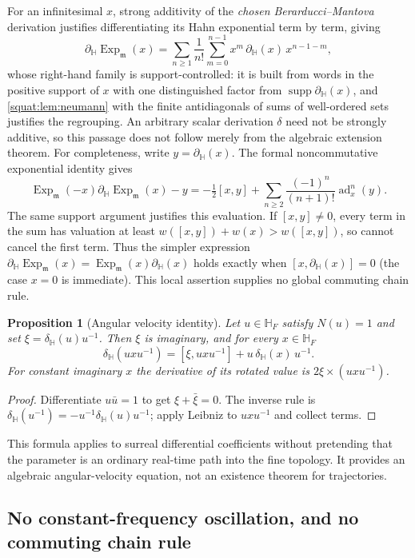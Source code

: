\documentclass[11pt,letterpaper]{article}
\numberwithin{equation}{section}
\newtheorem{proposition}[proposition]{Proposition}
\theoremstyle{definition}
\theoremstyle{remark}
\newcommand{\HF}{\mathbb H_F}
\newcommand{\mm}{\mathfrak m}
\newcommand{\supp}{\operatorname{supp}}
\newcommand{\ad}{\operatorname{ad}}
\newcommand{\Exp}{\operatorname{Exp}}
\newcommand{\Expm}{\Exp_{\mm}}
\newcommand{\dH}{\partial_{\mathbb H}}
\newcommand{\delH}{\delta_{\mathbb H}}
\begin{document}
For an infinitesimal $x$, strong additivity of the \emph{chosen Berarducci--Mantova}
derivation justifies differentiating its Hahn exponential term by term, giving
\begin{equation}\label{squat:eq:dexp}
 \dH\Expm(x)=\sum_{n\ge1}\frac1{n!}\sum_{m=0}^{n-1}x^m\,\dH(x)\,x^{n-1-m},
\end{equation}
whose right-hand family is support-controlled: it is built from words in the positive
support of $x$ with one distinguished factor from $\supp\dH(x)$, and
\cref{squat:lem:neumann} with the finite antidiagonals of sums of well-ordered sets
justifies the regrouping. An arbitrary scalar derivation $\delta$ need not be strongly
additive, so this passage does not follow merely from the algebraic extension theorem.
For completeness, write $y=\dH(x)$. The formal noncommutative exponential identity gives
\[
 \Expm(-x)\dH\Expm(x)-y
 =-\tfrac12[x,y]+\sum_{n\ge2}\frac{(-1)^n}{(n+1)!}\ad_x^n(y).
\]
The same support argument justifies this evaluation. If $[x,y]\ne0$, every term in
the sum has valuation at least $w([x,y])+w(x)>w([x,y])$, so cannot cancel the first
term. Thus the simpler expression $\dH\Expm(x)=\Expm(x)\dH(x)$ holds exactly when
$[x,\dH(x)]=0$ (the case $x=0$ is immediate). This local assertion supplies no global
commuting chain rule.

\begin{proposition}[Angular velocity identity]\label{squat:prop:angular}
Let $u\in\HF$ satisfy $N(u)=1$ and set $\xi=\delH(u)u^{-1}$. Then $\xi$ is imaginary, and
for every $x\in\HF$
\begin{equation}\label{squat:eq:angular-velocity}
 \delH(uxu^{-1})=[\xi,uxu^{-1}]+u\,\delH(x)\,u^{-1}.
\end{equation}
For constant imaginary $x$ the derivative of its rotated value is
$2\xi\times(uxu^{-1})$.
\end{proposition}
\begin{proof}
Differentiate $u\bar u=1$ to get $\xi+\bar\xi=0$. The inverse rule is
$\delH(u^{-1})=-u^{-1}\delH(u)u^{-1}$; apply Leibniz to $uxu^{-1}$ and collect terms.
\end{proof}

This formula applies to surreal differential coefficients without pretending that the
parameter is an ordinary real-time path into the fine topology. It provides an algebraic
angular-velocity equation, not an existence theorem for trajectories.

\subsection{No constant-frequency oscillation, and no commuting chain rule}
\label{squat:sub:nooscillation}
\end{document}
